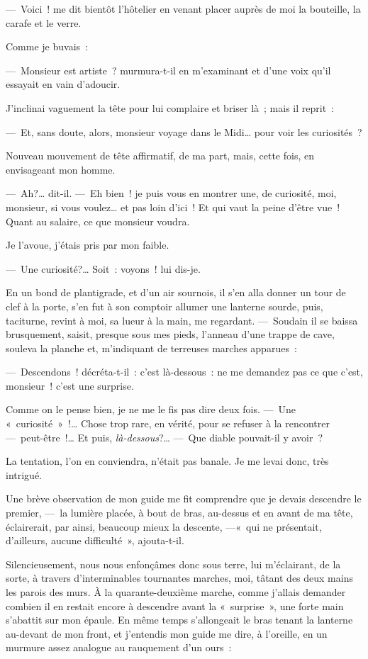 \documentclass[french,twoside]{book} %
\begin{document}
— Voici ! me dit bientôt l’hôtelier en venant placer auprès de moi la bouteille, la carafe et le verre.\par
Comme je buvais :\par
— Monsieur est artiste ? murmura-t-il en m’examinant et d’une voix qu’il essayait en vain d’adoucir.\par
J’inclinai vaguement la tête pour lui complaire et briser là ; mais il reprit :\par
— Et, sans doute, alors, monsieur voyage dans le Midi… pour voir les curiosités ?\par
Nouveau mouvement de tête affirmatif, de ma part, mais, cette fois, en envisageant mon homme.\par
— Ah?… dit-il. — Eh bien ! je puis vous en   montrer une, de curiosité, moi, monsieur, si vous voulez… et pas loin d’ici ! Et qui vaut la peine d’être vue ! Quant au salaire, ce que monsieur voudra.\par
Je l’avoue, j’étais pris par mon faible.\par
— Une curiosité?… Soit : voyons ! lui dis-je.\par
En un bond de plantigrade, et d’un air sournois, il s’en alla donner un tour de clef à la porte, s’en fut à son comptoir allumer une lanterne sourde, puis, taciturne, revint à moi, sa lueur à la main, me regardant. — Soudain il se baissa brusquement, saisit, presque sous mes pieds, l’anneau d’une trappe de cave, souleva la planche et, m’indiquant de terreuses marches apparues :\par
— Descendons ! décréta-t-il : c’est là-dessous : ne me demandez pas ce que c’est, monsieur ! c’est une surprise.\par
Comme on le pense bien, je ne me le fis pas dire deux fois. — Une « curiosité » !… Chose trop rare, en vérité, pour se refuser à la rencontrer— peut-être !… Et puis, \emph{là-dessous}?… — Que diable pouvait-il y avoir ?\par
   La tentation, l’on en conviendra, n’était pas banale. Je me levai donc, très intrigué.\par
Une brève observation de mon guide me fit comprendre que je devais descendre le premier, — la lumière placée, à bout de bras, au-dessus et en avant de ma tête, éclairerait, par ainsi, beaucoup mieux la descente, —« qui ne présentait, d’ailleurs, aucune difficulté », ajouta-t-il.\par
Silencieusement, nous nous enfonçâmes donc sous terre, lui m’éclairant, de la sorte, à travers d’interminables tournantes marches, moi, tâtant des deux mains les parois des murs. À la quarante-deuxième marche, comme j’allais demander combien il en restait encore à descendre avant la « surprise », une forte main s’abattit sur mon épaule. En même temps s’allongeait le bras tenant la lanterne au-devant de mon front, et j’entendis mon guide me dire, à l’oreille, en un murmure assez analogue au rauquement d’un ours :\par
\end{document}
